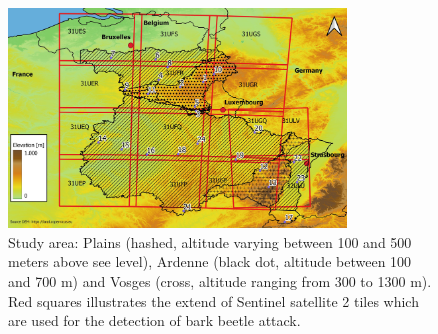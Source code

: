 \documentclass[3p,procedia]{elsarticle}
\begin{document}
\begin{figure} [htbp] 
	\centering
	\includegraphics[width=0.8\textwidth]{gde.jpeg}
	\caption{Study area: Plains (hashed, altitude varying between 100 and 500 meters above see level), Ardenne (black dot, altitude between 100 and 700 m) and Vosges (cross, altitude ranging from 300 to 1300 m). Red squares illustrates the extend of Sentinel satellite 2 tiles which are used for the detection of bark beetle attack.}
	\label{fig:situ}
\end{figure}
\end{document}
